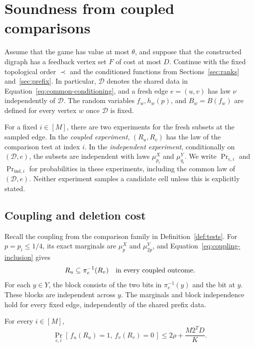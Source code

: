 \section{Soundness from coupled comparisons}
\label{sec:soundness}

Assume that the game has value at most \(\theta\), and suppose that
the constructed digraph has a feedback vertex set \(F\) of cost at
most \(D\).  Continue with the fixed topological order \(\prec\)
and the conditioned functions from Sections~\ref{sec:ranks}
and~\ref{sec:prefix}.  In particular, \(\mathcal D\) denotes the
shared data in Equation~\eqref{eq:common-conditioning}, and a fresh
edge \(e=(u,v)\) has law \(\nu\) independently of \(\mathcal D\).
The random variables \(f_w,h_w(p)\), and \(B_w=B(f_w)\) are defined
for every vertex \(w\) once \(\mathcal D\) is fixed.

For a fixed \(i\in[M]\), there are two experiments for the fresh
subsets at the sampled edge.  In the \emph{coupled experiment},
\((R_u,R_v)\) has the law of the comparison test at index \(i\).
In the \emph{independent experiment}, conditionally on
\((\mathcal D,e)\), the subsets are independent with laws
\(\mu_{p_i}^{X}\) and \(\mu_{q_i}^{Y}\).
We write \(\Pr_{\mathrm c,i}\) and \(\Pr_{\mathrm{ind},i}\) for
probabilities in these experiments, including the common law of
\((\mathcal D,e)\).  Neither experiment samples a candidate cell
unless this is explicitly stated.

\subsection{Coupling and deletion cost}

Recall the coupling from the comparison family in
Definition~\ref{def:tests}.  For \(p=p_i\le1/4\), its exact
marginals are \(\mu_p^X\) and \(\mu_{2p}^Y\), and
Equation~\eqref{eq:coupling-inclusion} gives
\[
  R_u\subseteq\pi_e^{-1}(R_v)
  \quad\hbox{in every coupled outcome.}
\]
For each \(y\in Y\), the block consists of the two bits in
\(\pi_e^{-1}(y)\) and the bit at \(y\).  These blocks are
independent across \(y\).  The marginals and block independence
hold for every fixed edge, independently of the shared prefix data.

\begin{lemma}
\label{lem:comparison-charge}
For every \(i\in[M]\),
\begin{equation}
\label{eq:coupled-comparison}
  \Pr_{\mathrm c,i}[\,f_u(R_u)=1,\ f_v(R_v)=0\,]
    \le 2\rho+\frac{M2^T D}{K}.
\end{equation}
\end{lemma}

